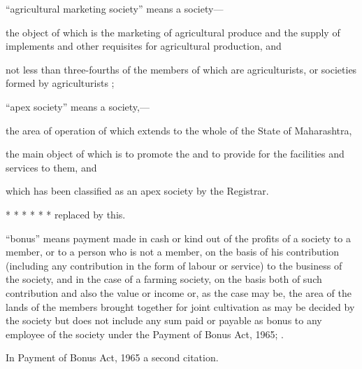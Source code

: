 \documentclass[reprint]{mhact}
\begin{document}
      \begin{subsectionlist}
         ``agricultural marketing society'' means a
        society---

        \begin{clause}

         the object of which is the marketing of
        agricultural produce and the supply of implements and other
        requisites for agricultural production, and

         not less than
        three-fourths of the members of which are agriculturists, or
        societies formed by agriculturists ;
      \end{clause}
      
            ``apex society'' means a society,--- 

      \begin{clause}
         the area of operation of which extends
        to the whole of the State of Maharashtra,

         the main object of which is to promote the
        and to provide for the facilities and services to them, and

         which has been classified as an
        apex society by the Registrar.
      \end{clause}

      

       *  * * * * * replaced by this.

       ``bonus'' means payment made in cash or kind out of
      the profits of a society to a member, or to a person who is not
      a member, on the basis of his contribution (including any
      contribution in the form of labour or service) to the business
      of the society, and in the case of a farming society, on the
      basis both of such contribution and also the value or income or,
      as the case may be, the area of the lands of the members brought
      together for joint cultivation as may be decided by the society
      but does not include any sum paid or payable as bonus to any
      employee of the society under the Payment of Bonus Act,
      1965;%
      .

       In Payment of Bonus Act, 1965 a second
      citation.
    \end{subsectionlist} 
\end{document}

